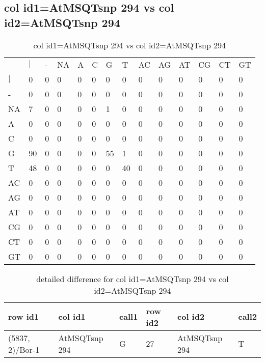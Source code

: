 \subsection{col id1=AtMSQTsnp 294 vs col id2=AtMSQTsnp 294}
\begin{center}
\begin{longtable}{|l|l|l|l|l|l|l|l|l|l|l|l|l|l|}
\caption{col id1=AtMSQTsnp 294 vs col id2=AtMSQTsnp 294} \label{table_dm634}\\
\hline
\\
\hline
&$|$&-&NA&A&C&G&T&AC&AG&AT&CG&CT&GT\\
$|$&0&0&0&0&0&0&0&0&0&0&0&0&0\\
-&0&0&0&0&0&0&0&0&0&0&0&0&0\\
NA&7&0&0&0&0&1&0&0&0&0&0&0&0\\
A&0&0&0&0&0&0&0&0&0&0&0&0&0\\
C&0&0&0&0&0&0&0&0&0&0&0&0&0\\
G&90&0&0&0&0&55&1&0&0&0&0&0&0\\
T&48&0&0&0&0&0&40&0&0&0&0&0&0\\
AC&0&0&0&0&0&0&0&0&0&0&0&0&0\\
AG&0&0&0&0&0&0&0&0&0&0&0&0&0\\
AT&0&0&0&0&0&0&0&0&0&0&0&0&0\\
CG&0&0&0&0&0&0&0&0&0&0&0&0&0\\
CT&0&0&0&0&0&0&0&0&0&0&0&0&0\\
GT&0&0&0&0&0&0&0&0&0&0&0&0&0\\
\hline
\end{longtable}
\end{center}

\begin{center}
\begin{longtable}{|l|l|l|l|l|l|}
\caption{detailed difference for col id1=AtMSQTsnp 294 vs col id2=AtMSQTsnp 294} \label{table_dm635}\\
\hline
row id1&col id1&call1&row id2&col id2&call2\\
\hline
(5837, 2)/Bor-1&AtMSQTsnp 294&G&27&AtMSQTsnp 294&T\\
\hline
\end{longtable}
\end{center}

